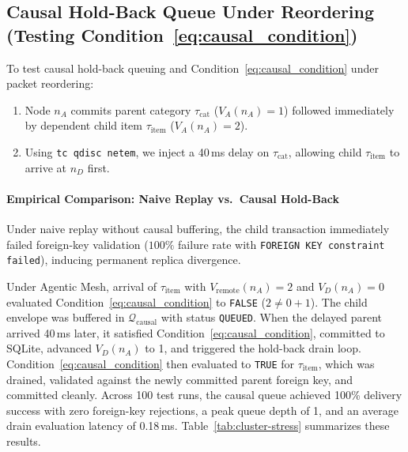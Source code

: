 \subsection{Causal Hold-Back Queue Under Reordering (Testing Condition~\eqref{eq:causal_condition})}
\label{sec:eval-holdback}

To test causal hold-back queuing and Condition~\eqref{eq:causal_condition} under packet reordering:
\begin{enumerate}
    \item Node $n_A$ commits parent category $\tau_{\text{cat}}$ ($V_A(n_A)=1$) followed immediately by dependent child item $\tau_{\text{item}}$ ($V_A(n_A)=2$).
    \item Using \texttt{tc qdisc netem}, we inject a 40\,ms delay on $\tau_{\text{cat}}$, allowing child $\tau_{\text{item}}$ to arrive at $n_D$ first.
\end{enumerate}

\paragraph{Empirical Comparison: Naive Replay vs.\ Causal Hold-Back}
Under naive replay without causal buffering, the child transaction immediately failed foreign-key validation ($100\%$ failure rate with \texttt{FOREIGN KEY constraint failed}), inducing permanent replica divergence.

Under Agentic Mesh, arrival of $\tau_{\text{item}}$ with $V_{\text{remote}}(n_A) = 2$ and $V_D(n_A) = 0$ evaluated Condition~\eqref{eq:causal_condition} to \texttt{FALSE} ($2 \neq 0 + 1$). The child envelope was buffered in $\mathcal{Q}_{\text{causal}}$ with status \texttt{QUEUED}. When the delayed parent arrived 40\,ms later, it satisfied Condition~\eqref{eq:causal_condition}, committed to SQLite, advanced $V_D(n_A)$ to 1, and triggered the hold-back drain loop. Condition~\eqref{eq:causal_condition} then evaluated to \texttt{TRUE} for $\tau_{\text{item}}$, which was drained, validated against the newly committed parent foreign key, and committed cleanly. Across 100 test runs, the causal queue achieved 100\% delivery success with zero foreign-key rejections, a peak queue depth of 1, and an average drain evaluation latency of 0.18\,ms. Table~\ref{tab:cluster-stress} summarizes these results.

